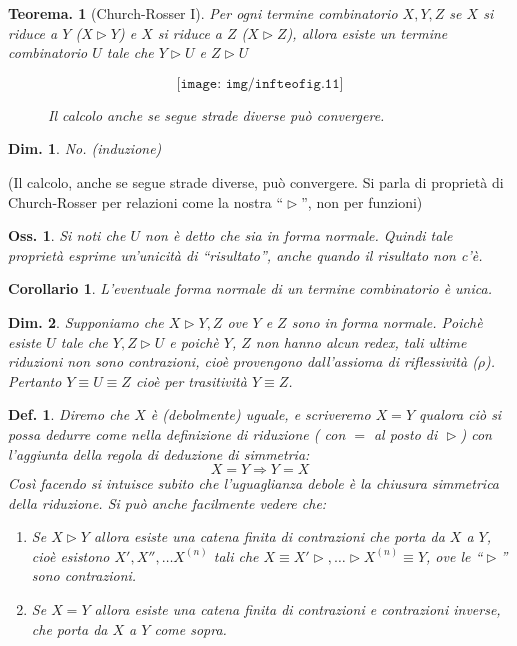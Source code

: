\documentclass{book}
\newtheorem{definizione}{Def.}[chapter]
\newtheorem{osservazione}{Oss.}[chapter]
\newtheorem{teorema}{Teorema.}[chapter]
\newtheorem{dimostrazione}{Dim.}[chapter]
\newtheorem{corollario}{Corollario}[chapter]
\begin{document}
\begin{teorema}[Church-Rosser I]
Per ogni termine combinatorio $X, Y, Z$ se $X$ si riduce a $Y$ ($X
\vartriangleright Y$) e $X$ si riduce a $Z$ ($X \vartriangleright Z$), allora
esiste un termine combinatorio $U$ tale che $Y \vartriangleright U$ e $ Z
\vartriangleright U$
\begin{figure}[!h]
\[ \texttt{[image: img/infteofig.11]} \]
\caption{Il calcolo anche se segue strade diverse pu\`o convergere.}
\end{figure}
\end{teorema}

\begin{dimostrazione}
No. (induzione)
\end{dimostrazione}

(Il calcolo, anche se segue strade diverse, pu\`o convergere. Si parla di 
propriet\`a di Church-Rosser per relazioni come la nostra 
``$\vartriangleright$'', non per funzioni)

\begin{osservazione}
Si noti che $U$ non \`e detto che sia in forma normale. Quindi tale propriet\`a
esprime un'unicit\`a di ``risultato'', anche quando il risultato non c'\`e.
\end{osservazione}

\begin{corollario}
L'eventuale forma normale di un termine combinatorio \`e\emph{ unica}.
\end{corollario}

\begin{dimostrazione}
Supponiamo che $X \vartriangleright Y, Z$ ove $Y$ e $Z$ sono in forma normale.
Poich\`e esiste $U$ tale che $Y, Z \vartriangleright U$ e poich\`e $Y$, $Z$
non hanno alcun redex, tali ultime riduzioni non sono contrazioni, cio\`e
provengono dall'assioma di riflessivit\`a ($\rho$).
Pertanto $Y \equiv U \equiv Z$ cio\`e per trasitivit\`a $Y \equiv Z$.
\end{dimostrazione}

\begin{definizione}
Diremo che $X$ \`e \emph{(debolmente) uguale}, e scriveremo $X = Y$ qualora
ci\`o si possa dedurre come nella definizione di riduzione ( con $=$ al posto
di $\vartriangleright$) con l'aggiunta della regola di deduzione di simmetria:
\[
X = Y \Longrightarrow Y = X
\]
Cos\`i facendo si intuisce subito che l'uguaglianza debole \`e la chiusura
simmetrica della riduzione. Si pu\`o anche facilmente vedere che:

\begin{enumerate}
  \item[-]Se $X \vartriangleright Y$ allora esiste una catena finita di
    contrazioni che porta da $X$ a $Y$, cio\`e esistono $X', X'', \ldots
    X^{(n)}$ tali che $X \equiv X' \vartriangleright, \ldots \vartriangleright
    X^{(n)} \equiv Y$, ove le ``$\vartriangleright$'' sono contrazioni.
  \item[-]Se $X = Y$ allora esiste una catena finita di contrazioni e
    contrazioni inverse, che porta da $X$ a $Y$ come sopra.
\end{enumerate}
\end{definizione}
\end{document}
